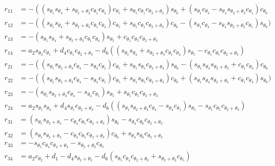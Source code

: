 \documentclass[12pt,a4paper]{article}
\begin{document}
\begin{align*}
r_{11} &= -((s_{\theta_1}s_{\theta_4} + s_{\theta_2 + \theta_3}c_{\theta_1}c_{\theta_4})c_{\theta_5} + s_{\theta_5}c_{\theta_1}c_{\theta_2 + \theta_3})s_{\theta_6} + (s_{\theta_1}c_{\theta_4} - s_{\theta_4}s_{\theta_2 + \theta_3}c_{\theta_1})c_{\theta_6} \\
r_{12} &= -((s_{\theta_1}s_{\theta_4} + s_{\theta_2 + \theta_3}c_{\theta_1}c_{\theta_4})c_{\theta_5} + s_{\theta_5}c_{\theta_1}c_{\theta_2 + \theta_3})c_{\theta_6} - (s_{\theta_1}c_{\theta_4} - s_{\theta_4}s_{\theta_2 + \theta_3}c_{\theta_1})s_{\theta_6}) \\
r_{13} &= -(s_{\theta_1}s_{\theta_4} + s_{\theta_2 + \theta_3}c_{\theta_1}c_{\theta_4})s_{\theta_5} + c_{\theta_1}c_{\theta_5}c_{\theta_2 + \theta_3} \\
r_{14} &=a_2s_{\theta_2}c_{\theta_1} + d_4c_{\theta_1}c_{\theta_2 + \theta_3} - d_6((s_{\theta_1}s_{\theta_4} + s_{\theta_2 + \theta_3}c_{\theta_1}c_{\theta_4})s_{\theta_5} - c_{\theta_1}c_{\theta_5}c_{\theta_2 + \theta_3})\\
r_{21} &=-((s_{\theta_1}s_{\theta_2 + \theta_3}c_{\theta_4} - s_{\theta_4}c_{\theta_1})c_{\theta_5} + s_{\theta_1}s_{\theta_5}c_{\theta_2 + \theta_3})s_{\theta_6} - (s_{\theta_1}s_{\theta_4}s_{\theta_2 + \theta_3} + c_{\theta_1}c_{\theta_4})c_{\theta_6}\\
r_{22} &=-((s_{\theta_1}s_{\theta_2 + \theta_3}c_{\theta_4} - s_{\theta_4}c_{\theta_1})c_{\theta_5} + s_{\theta_1}s_{\theta_5}c_{\theta_2 + \theta_3})c_{\theta_6} + (s_{\theta_1}s_{\theta_4}s_{\theta_2 + \theta_3} + c_{\theta_1}c_{\theta_4})s_{\theta_6}) \\
r_{23} &=-(s_{\theta_1}s_{\theta_2 + \theta_3}c_{\theta_4} - s_{\theta_4}c_{\theta_1})s_{\theta_5} + s_{\theta_1}c_{\theta_5}c_{\theta_2 + \theta_3} \\
r_{24} &=a_2s_{\theta_1}s_{\theta_2} + d_4s_{\theta_1}c_{\theta_2 + \theta_3} - d_6((s_{\theta_1}s_{\theta_2 + \theta_3}c_{\theta_4} - s_{\theta_4}c_{\theta_1})s_{\theta_5} - s_{\theta_1}c_{\theta_5}c_{\theta_2 + \theta_3})\\
r_{31} &=(s_{\theta_5}s_{\theta_2 + \theta_3} - c_{\theta_4}c_{\theta_5}c_{\theta_2 + \theta_3})s_{\theta_6} - s_{\theta_4}c_{\theta_6}c_{\theta_2 + \theta_3}\\
r_{32} &=(s_{\theta_5}s_{\theta_2 + \theta_3} - c_{\theta_4}c_{\theta_5}c_{\theta_2 + \theta_3})c_{\theta_6} + s_{\theta_4}s_{\theta_6}c_{\theta_2 + \theta_3}\\
r_{33} &=-s_{\theta_5}c_{\theta_4}c_{\theta_2 + \theta_3} - s_{\theta_2 + \theta_3}c_{\theta_5}\\
r_{34} &=a_2c_{\theta_2} + d_1 - d_4s_{\theta_2 + \theta_3} - d_6(s_{\theta_5}c_{\theta_4}c_{\theta_2 + \theta_3} + s_{\theta_2 + \theta_3}c_{\theta_5}) \\
\end{align*}
\end{document}
